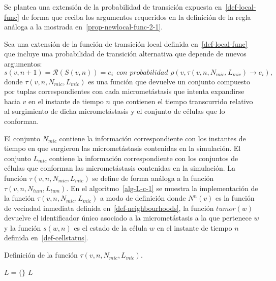 Se plantea una extensi\'on de la probabilidad de transici\'on expuesta en~\ref{def-local-func} de forma que reciba los argumentos requeridos en la definici\'on de la regla an\'aloga a la mostrada en~\ref{prop-newlocal-func-2-1}. 

\begin{definition}
\label{prop-newlocal-func-5}
Sea una extensi\'on de la funci\'on de transici\'on local definida en~\ref{def-local-func} que incluye una probabilidad de transici\'on alternativa que depende de nuevos argumentos:
\begin{equation}
s(v,n+1) = \mathcal{R}(S(v,n)) = e_i~~\textit{con probabilidad } \rho(v,\tau(v,n,N_{mic},L_{mic}) \rightarrow e_i), \label{eq-newlocal-func-5}
\end{equation}
donde $\tau(v,n,N_{mic},L_{mic})$ es una funci\'on que devuelve un conjunto compuesto por tuplas correspondientes con cada micromet\'astasis que intenta expandirse hacia $v$ en el instante de tiempo $n$ que contienen el tiempo transcurrido relativo al surgimiento de dicha micromet\'astasis y el conjunto de c\'elulas que lo conforman. 
\end{definition}

El conjunto $N_{mic}$ contiene la informaci\'on correspondiente con los instantes de tiempo en que surgieron las micromet\'astasis contenidas en la simulaci\'on. El conjunto $L_{mic}$ contiene la informaci\'on correspondiente con los conjuntos de c\'elulas que conforman las micromet\'astasis contenidas en la simulaci\'on. La funci\'on $\tau(v,n,N_{mic},L_{mic})$ se define de forma an\'aloga a la funci\'on $\tau(v,n,N_{tum},L_{tum})$. En el algoritmo~\ref{alg-L-c-1} se muestra la implementaci\'on de la funci\'on $\tau(v,n,N_{mic},L_{mic})$ a modo de definici\'on donde $N^n(v)$ es la funci\'on de vecindad inmediata definida en~\ref{def-neighbourhoods}, la funci\'on $tumor(w)$ devuelve el identificador \'unico asociado a la micromet\'astasis a la que pertenece $w$ y la funci\'on $s(w,n)$ es el estado de la c\'elula $w$ en el instante de tiempo $n$ definida en~\ref{def-cellstatus}. 

\begin{algorithm}[!ht]
\caption{Definici\'on de la funci\'on $\tau(v,n,N_{mic},L_{mic})$.} \label{alg-L-c-1}
$L = \lbrace \rbrace$\;
\Return $L$\;
\end{algorithm}

